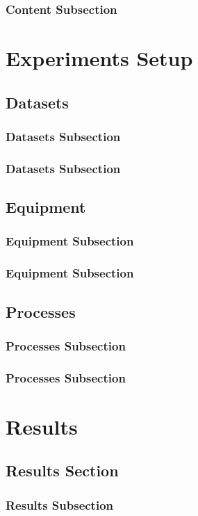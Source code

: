 \documentclass[a4paper,twoside,12pt]{book}
\begin{document}
				\subsection{Content Subsection}
		\chapter{Experiments Setup} 
			\section{Datasets}
				\subsection{Datasets Subsection}
				\subsection{Datasets Subsection}
			\section{Equipment}
				\subsection{Equipment Subsection}
				\subsection{Equipment Subsection}
			\section{Processes}
				\subsection{Processes Subsection}
				\subsection{Processes Subsection}
		\chapter{Results} 
			\section{Results Section}
				\subsection{Results Subsection}
\end{document}
